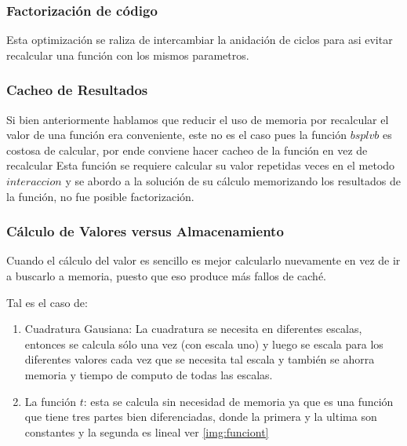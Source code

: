 \documentclass[a4paper,openright,12pt, oneside]{book}
\begin{document}
\subsubsection{Factorizaci\'on de c\'odigo}
Esta optimizaci\'on se raliza de intercambiar la anidaci\'on de ciclos para asi evitar recalcular una funci\'on con los mismos parametros.

\subsubsection{Cacheo de Resultados}
Si bien anteriormente hablamos que reducir el uso de memoria por recalcular el valor de una funci\'on era conveniente, este no es el caso pues la funci\'on $bsplvb$ es costosa de calcular, por ende conviene hacer cacheo de la funci\'on en vez de recalcular
Esta funci\'on se requiere calcular su valor repetidas veces en el metodo $interaccion$ y se abordo a la soluci\'on de su c\'alculo memorizando los resultados de la funci\'on, no fue posible factorizaci\'on.

\subsubsection{C\'alculo de Valores versus Almacenamiento}
Cuando el c\'alculo del valor es sencillo es mejor calcularlo nuevamente en vez de ir a buscarlo a memoria, puesto que eso produce m\'as fallos de cach\'e.

Tal es el caso de:
\begin{enumerate}
    \item Cuadratura Gausiana: La cuadratura se necesita en diferentes escalas, entonces se calcula s\'olo una vez (con escala uno) y luego se escala para los diferentes valores cada vez que se necesita tal escala y tambi\'en se ahorra memoria y tiempo de computo de todas las escalas.
    \item La funci\'on $t$: esta se calcula sin necesidad de memoria ya que es una funci\'on que tiene tres partes bien diferenciadas, donde la primera y la ultima son constantes y la segunda es lineal ver \ref{img:funciont}
\end{enumerate}
\end{document}
